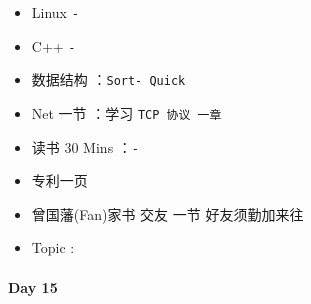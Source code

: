 \documentclass[UTF8,a4paper,8pt]{ctexart}
\begin{document}
	 	 \begin{itemize}[itemindent = 1em]
	 	 	\renewcommand\labelitemi{\makebox[0pt][l]{$\square$}\hspace{1em}} 
	 	 	\renewcommand\labelitemi{\makebox[0pt][l]{$\square$}\raisebox{.15ex}{\hspace{0.1em}$\checkmark$}}	 	
	 	 	\item   Linux \verb|-|
	 	 	\item   C++   \verb|-|
	 	 	
	 	 	\item   数据结构 ：\verb|Sort- Quick|
	 	 	\item   Net 一节 ：学习 \verb|TCP 协议 一章|	
	 	 	\renewcommand\labelitemi{\makebox[0pt][l]{$\square$}\hspace{1em}} 
	 	 	\item   读书  30 Mins	：\verb|-|
		 	\item   专利一页	
	 	 	
	 	 	\renewcommand\labelitemi{\makebox[0pt][l]{$\square$}\raisebox{.15ex}{\hspace{0.1em}$\checkmark$}}
	 	 	\item   曾国藩(Fan)家书 交友 一节 好友须勤加来往
	 	 	\item   Topic :
	 	 \end{itemize}
 	 \paragraph{Day 15      \quad     }
		 
\end{document}
